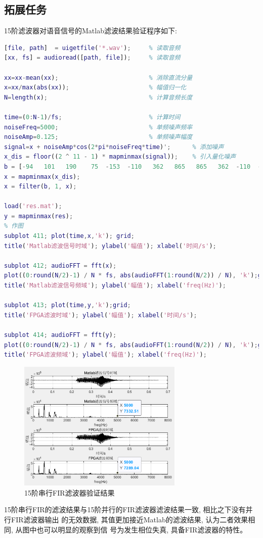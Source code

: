 \documentclass{article}
\begin{document}
\subsection*{拓展任务}
15阶滤波器对语音信号的Matlab滤波结果验证程序如下:
\begin{lstlisting}[language=Matlab, caption={语音信号滤波验证程序}]
[file, path]  = uigetfile('*.wav');     % 读取音频
[xx, fs] = audioread([path, file]);     % 读取音频

xx=xx-mean(xx);                         % 消除直流分量
x=xx/max(abs(xx));                      % 幅值归一化
N=length(x);                            % 计算音频长度

time=(0:N-1)/fs;                        % 计算时间
noiseFreq=5000;                         % 单频噪声频率
noiseAmp=0.125;                         % 单频噪声幅度
signal=x + noiseAmp*cos(2*pi*noiseFreq*time)';      % 添加噪声
x_dis = floor((2 ^ 11 - 1) * mapminmax(signal));    % 引入量化噪声
b = [-94   101   190    75  -153  -110   362   865   865   362  -110  -153    75   190   101   -94];
x = mapminmax(x_dis);
x = filter(b, 1, x);

load('res.mat');
y = mapminmax(res);
% 作图
subplot 411; plot(time,x,'k'); grid;
title('Matlab滤波信号时域'); ylabel('幅值'); xlabel('时间/s');

subplot 412; audioFFT = fft(x);
plot((0:round(N/2)-1) / N * fs, abs(audioFFT(1:round(N/2)) / N), 'k');grid;
title('Matlab滤波信号频域'); ylabel('幅值'); xlabel('freq(Hz)');

subplot 413; plot(time,y,'k');grid;
title('FPGA滤波时域'); ylabel('幅值'); xlabel('时间/s');

subplot 414; audioFFT = fft(y);
plot((0:round(N/2)-1) / N * fs, abs(audioFFT(1:round(N/2)) / N), 'k');grid;
title('FPGA滤波频域'); ylabel('幅值'); xlabel('freq(Hz)');    
\end{lstlisting}
\begin{figure}[H]
    \centering
    \includegraphics[width=0.7\textwidth]{image/2024-06-27-02-35-01.png}
    \caption{15阶串行FIR滤波器验证结果}
    \label{image_verify_extend_1}
\end{figure}
15阶串行FIR的滤波结果与15阶并行的FIR滤波器滤波结果一致, 相比之下没有并行FIR滤波器输出
的无效数据, 其值更加接近Matlab的滤波结果, 认为二者效果相同, 从图中也可以明显的观察到信
号为发生相位失真, 具备FIR滤波器的特性。
\end{document}
